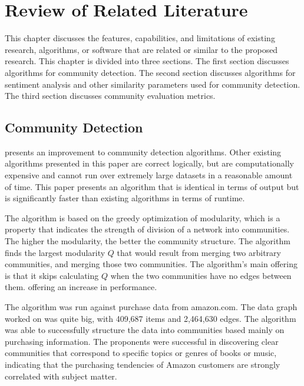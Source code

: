 %
%
%                 

\chapter{Review of Related Literature}
\label{sec:relatedlit}

This chapter discusses the features, capabilities, and limitations of existing research, algorithms, or software that are related or similar to the proposed research. This chapter is divided into three sections. The first section discusses algorithms for community detection. The second section discusses algorithms for sentiment analysis and other similarity parameters used for community detection. The third section discusses community evaluation metrics.

\section{Community Detection}

 presents an improvement to community detection algorithms. Other existing algorithms presented in this paper are correct logically, but are computationally expensive and cannot run over extremely large datasets in a reasonable amount of time. This paper presents an algorithm that is identical in terms of output but is significantly faster than existing algorithms in terms of runtime.

The algorithm is based on the greedy optimization of modularity, which is a property that indicates the strength of division of a network into communities. The higher the modularity, the better the community structure. 
The algorithm finds the largest modularity $Q$ that would result from merging two arbitrary communities, and merging those two communities. The algorithm's main offering is that it skips calculating $Q$ when the two communities have no edges between them. offering an increase in performance. 

The algorithm was run against purchase data from amazon.com. The data graph worked on was quite big, with 409,687 items and 2,464,630 edges. The algorithm was able to successfully structure the data into communities based mainly on purchasing information. The proponents were successful in discovering clear communities that correspond to specific topics or genres of books or music, indicating that the purchasing tendencies of Amazon customers are strongly correlated with subject matter.

